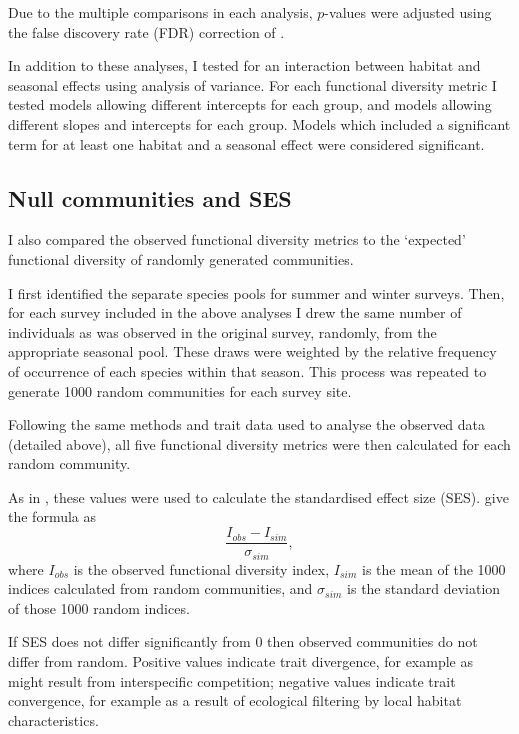 \documentclass[12pt,a4paper,draft]{book}
\begin{document}
Due to the multiple comparisons in each analysis, $p$-values were adjusted using the false discovery rate (FDR) correction of \cite{Benjamini1995}.

In addition to these analyses, I tested for an interaction between habitat and seasonal effects using analysis of variance. For each functional diversity metric I tested models allowing different intercepts for each group, and models allowing different slopes and intercepts for each group. Models which included a significant term for at least one habitat and a seasonal effect were considered significant.

\subsection{Null communities and SES}

I also compared the observed functional diversity metrics to the `expected' functional diversity of randomly generated communities.

I first identified the separate species pools for summer and winter surveys. Then, for each survey included in the above analyses I drew the same number of individuals as was observed in the original survey, randomly, from the appropriate seasonal pool. These draws were weighted by the relative frequency of occurrence of each species within that season. This process was repeated to generate 1000 random communities for each survey site.

Following the same methods and trait data used to analyse the observed data (detailed above), all five functional diversity metrics were then calculated for each random community.

As in \cite{Mendez2012}, these values were used to calculate the standardised effect size (SES). \cite{Gotelli2002} give the formula as
\begin{equation}
\frac{I_{obs} - I_{sim}}{\sigma_{sim}},
\end{equation}
where $I_{obs}$ is the observed functional diversity index, $I_{sim}$ is the mean of the 1000 indices calculated from random communities, and $\sigma_{sim}$ is the standard deviation of those 1000 random indices.

If SES does not differ significantly from 0 then observed communities do not differ from random. Positive values indicate trait divergence, for example as might result from interspecific competition; negative values indicate trait convergence, for example as a result of ecological filtering by local habitat characteristics.
\end{document}
